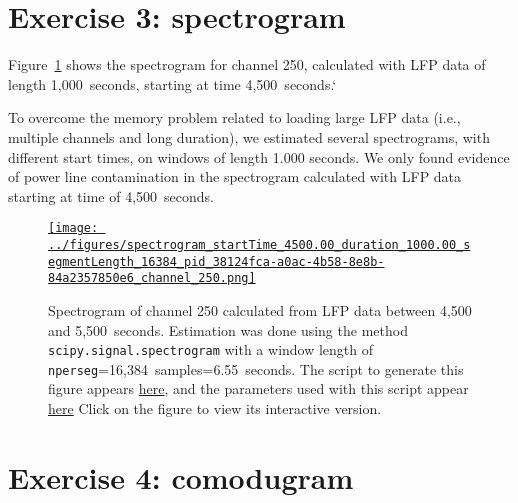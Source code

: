 \documentclass[12pt]{article}
\begin{document}
\section*{Exercise 3: spectrogram}

Figure~\ref{fig:spectrogramChannel250} shows the spectrogram for channel 250,
calculated with LFP data of length 1,000~seconds, starting at time 4,500~seconds.`

To overcome the memory problem related to loading large LFP data (i.e.,
multiple channels and long duration), we estimated several spectrograms, with
different start times, on windows of
length 1.000 seconds. We only found evidence of power line contamination in the
spectrogram calculated with LFP data starting at time of 4,500~seconds.

\begin{figure}[H]
    \begin{center}
        \href{https://www.gatsby.ucl.ac.uk/~rapela/neuroinformatics/2023/ws3/figures/spectrogram_startTime_4500.00_duration_1000.00_segmentLength_16384_pid_38124fca-a0ac-4b58-8e8b-84a2357850e6_channel_250.html}{\texttt{[image: ../figures/spectrogram\_startTime\_4500.00\_duration\_1000.00\_segmentLength\_16384\_pid\_38124fca-a0ac-4b58-8e8b-84a2357850e6\_channel\_250.png]}}



        \caption{Spectrogram of channel 250 calculated from LFP data between
        4,500 and 5,500~seconds. Estimation was done
        using the method \texttt{scipy.signal.spectrogram} with a window length
        of \texttt{nperseg}=16,384~samples=6.55~seconds.
        The script to generate this figure appears
        \href{https://github.com/joacorapela/neuroinformatics23/blob/master/worksheets/ws3/mySolution/code/scripts/doComputeAndPlotSpectrogram.py}{here},
        and the parameters used with this script appear
        \href{https://github.com/joacorapela/neuroinformatics23/blob/master/worksheets/ws3/mySolution/code/scripts/doComputeAndPlotSpectrogram.csh}{here}
        Click on the figure to view its interactive version.  }

                \label{fig:spectrogramChannel250}

            \end{center}
        \end{figure}

\section*{Exercise 4: comodugram}
\end{document}
